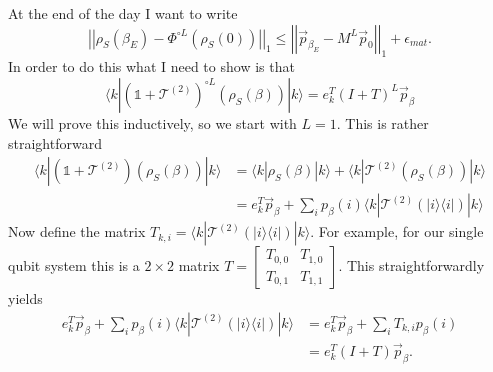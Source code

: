 \documentclass{article}
\newcommand{\ket}[1]{|#1\rangle}
\newcommand{\bra}[1]{\langle #1|}
\newcommand{\ketbra}[2]{| #1\rangle\! \langle #2|}
\newcommand{\norm}[1]{\left| \left| #1 \right| \right|}
\newcommand{\identity}{\mathds{1}}
\begin{document}
At the end of the day I want to write
\begin{equation}
    \norm{\rho_S(\beta_E) - \Phi^{\circ L}(\rho_S(0))}_1 \le \norm{\vec{p}_{\beta_E} - M^{L} \vec{p}_0}_1 + \epsilon_{mat}.
\end{equation}
In order to do this what I need to show is that 
\begin{equation}
    \bra{k} (\identity + \mathcal{T}^{(2)})^{\circ L}(\rho_S(\beta)) \ket{k} = e_k^T(I + T)^L \vec{p}_{\beta}
\end{equation}
We will prove this inductively, so we start with $L = 1$. This is rather straightforward
\begin{align}
    \bra{k} (\identity + \mathcal{T}^{(2)})(\rho_S(\beta)) \ket{k} &= \bra{k} \rho_S(\beta) \ket{k} + \bra{k} \mathcal{T}^{(2)}(\rho_S(\beta)) \ket{k} \\
    &= e_k^T \vec{p}_{\beta} + \sum_i p_{\beta}(i) \bra{k} \mathcal{T}^{(2)}(\ketbra{i}{i}) \ket{k}
\end{align}
Now define the matrix $T_{k,i} = \bra{k} \mathcal{T}^{(2)}(\ketbra{i}{i}) \ket{k}$. For example, for our single qubit system this is a $2 \times 2$ matrix $T = \begin{bmatrix}
    T_{0, 0} & T_{1, 0} \\
    T_{0, 1} & T_{1, 1}
\end{bmatrix}$. This straightforwardly yields
\begin{align}
    e_k^T \vec{p}_{\beta} + \sum_i p_{\beta}(i) \bra{k} \mathcal{T}^{(2)}(\ketbra{i}{i}) \ket{k} &= e_k^T \vec{p}_{\beta} + \sum_i T_{k, i} p_{\beta}(i)  \\
    &= e_k^T(I + T) \vec{p}_{\beta}.
\end{align}
\end{document}
